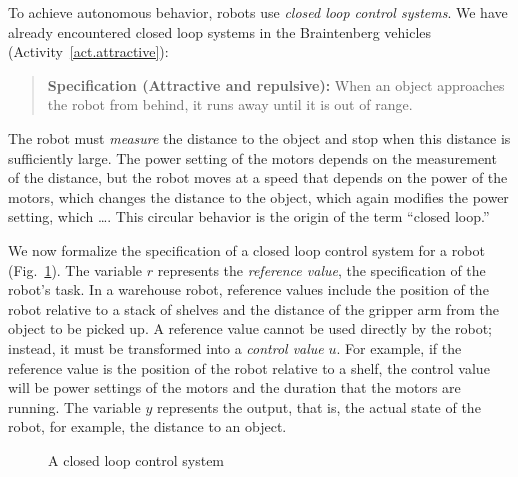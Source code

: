 To achieve autonomous behavior, robots use \emph{closed loop control systems}. We have already encountered closed loop systems in the Braintenberg vehicles (Activity~\ref{act.attractive}):
\begin{quote}
\normalsize\noindent\textbf{Specification (Attractive and repulsive):} When an object approaches the robot from behind, it runs away until it is out of range.
\end{quote}
The robot must \emph{measure} the distance to the object and stop when this distance is sufficiently large. The power setting of the motors depends on the measurement of the distance, but the robot moves at a speed that depends on the power of the motors, which changes the distance to the object, which again modifies the power setting, which \ldots. This circular behavior is the origin of the term ``closed loop.''

We now formalize the specification of a closed loop control system for a robot (Fig.~\ref{fig.control-model}). The variable $r$ represents the \emph{reference value}, the specification of the robot's task. In a warehouse robot, reference values include the position of the robot relative to a stack of shelves and the distance of the gripper arm from the object to be picked up. A reference value cannot be used directly by the robot; instead, it must be transformed into a \emph{control value} $u$. For example, if the reference value is the position of the robot relative to a shelf, the control value will be power settings of the motors and the duration that the motors are running. The variable $y$ represents the output, that is, the actual state of the robot, for example, the distance to an object.

\begin{figure}
\begin{center}
\caption{A closed loop control system}\label{fig.control-model}
\end{center}
\end{figure}

